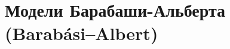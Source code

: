 \documentclass[t]{beamer}
\begin{document}
    \section{Модели Барабаши-Альберта (Barabási–Albert)} 
        \subsection{}

        \begin{frame}
            
        \end{frame}	

        \begin{frame}
            
        \end{frame}	

        \begin{frame}
            
        \end{frame}	
        
\end{document}
